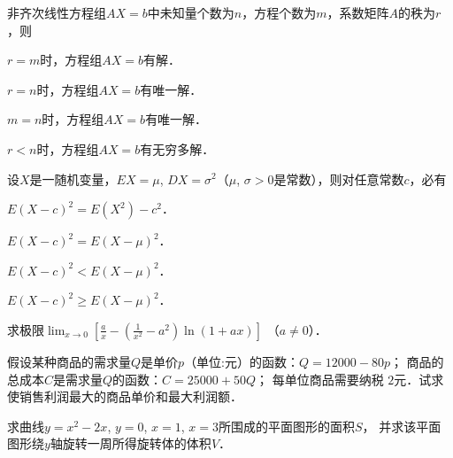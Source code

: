 \documentclass[plain,noanswer,medmath]{../../template/jnuexam}
\begin{document}




\begin{problem}
非齐次线性方程组$AX = b$中未知量个数为$n$，方程个数为$m$，系数矩阵$A$的秩为$r$，则\pickout{}
\begin{abcd}
\item $r = m$时，方程组$AX = b$有解．
\item $r = n$时，方程组$AX = b$有唯一解．
\item $m = n$时，方程组$AX = b$有唯一解．
\item $r < n$时，方程组$AX = b$有无穷多解．
\end{abcd}
\end{problem}


\begin{problem}
设$X$是一随机变量，$EX = \mu$, $DX = \sigma^2$（$\mu$, $\sigma > 0$是常数），则对任意常数$c$，必有\pickout{}
\begin{abcd}
\item $E(X - c)^2 = E(X^2) - c^2$．			
\item $E(X - c)^2 = E(X - \mu)^2$．
\item $E(X - c)^2 < E(X - \mu)^2$．			
\item $E(X - c)^2 \ge E(X - \mu)^2$．
\end{abcd}
\end{problem}



\begin{problem}
求极限$\lim_{x \to 0} \left[\frac{a}{x} - \left(\frac{1}{x^2} - a^2 \right)\ln(1 + ax) \right]$%
（$a \ne 0$）．
\end{problem}






\begin{problem}
假设某种商品的需求量$Q$是单价$p$（单位:元）的函数：$Q = 12000 - 80p$；
商品的总成本$C$是需求量$Q$的函数：$C = 25000 + 50Q$；
每单位商品需要纳税 $2$元．试求使销售利润最大的商品单价和最大利润额．
\end{problem}



\begin{problem}
求曲线$y = x^2 - 2x$, $y = 0$, $x = 1$, $x = 3$所围成的平面图形的面积$S$，
并求该平面图形绕$y$轴旋转一周所得旋转体的体积$V$．
\end{problem}
\end{document}
